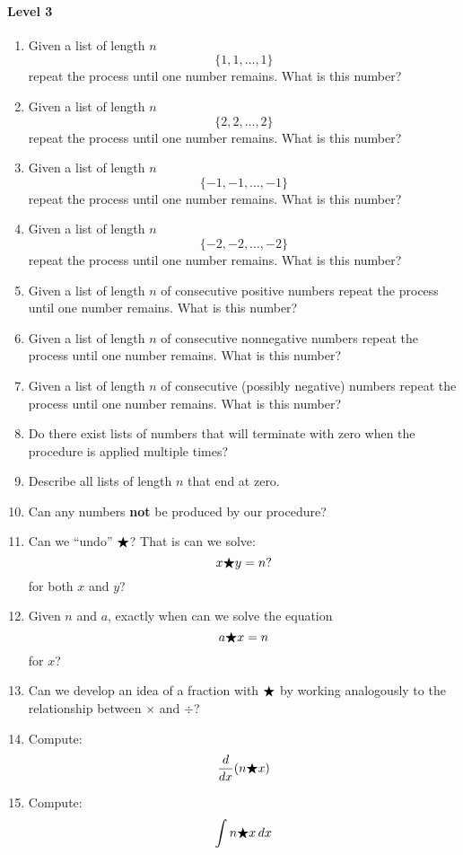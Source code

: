 \documentclass[handout,nooutcomes]{ximera}
\begin{document}
\begin{problem}
\begin{freeResponse}
  \paragraph{Level 3}
  \begin{enumerate}
  \item Given a list of length $n$
    \[
    \{1,1, \dots, 1\}
    \]
    repeat the process until one number remains. What is this number?
  \item Given a list of length $n$
    \[
    \{2,2, \dots, 2\}
    \]
    repeat the process until one number remains. What is this number?
  \item Given a list of length $n$
    \[
    \{-1,-1, \dots, -1\}
    \]
    repeat the process until one number remains. What is this number?
  \item Given a list of length $n$
    \[
    \{-2,-2, \dots, -2\}
    \]
    repeat the process until one number remains. What is this number?
  \item Given a list of length $n$ of consecutive positive numbers
    repeat the process until one number remains. What is this number?
  \item Given a list of length $n$ of consecutive nonnegative numbers
    repeat the process until one number remains. What is this number?
  \item Given a list of length $n$ of consecutive (possibly negative)
    numbers repeat the process until one number remains. What is this
    number?
  \item Do there exist lists of numbers that will terminate with zero
    when the procedure is applied multiple times?
  \item Describe all lists of length $n$ that end at zero.
  \item Can any numbers \textbf{not} be produced by our procedure?
  \item Can we ``undo'' $\bigstar$? That is can we solve:
    \[
    x \bigstar y = n?
    \]
    for both $x$ and $y$?
  \item Given $n$ and $a$, exactly when can we solve the equation
      \[
      a\bigstar x = n
      \]
      for $x$?
      \item Can we develop an idea of a fraction with $\bigstar$ by working
        analogously to the relationship between $\times$ and $\div$?
  \item Compute:
    \[
    \frac{d}{dx} (n\bigstar x)
    \]
  \item Compute:
    \[
    \int n\bigstar x \,d x
    \]
  \end{enumerate}
\end{freeResponse}
\end{problem}
\end{document}
